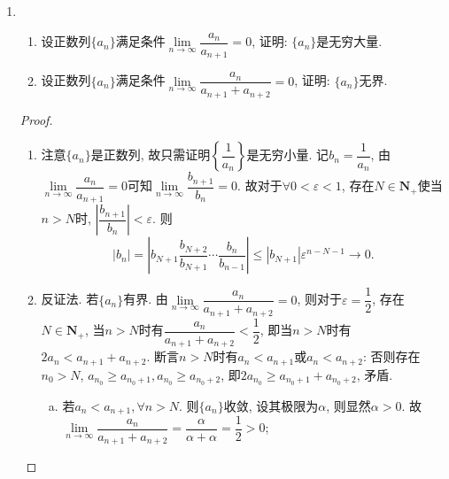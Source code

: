 \documentclass[a4paper,11pt,twoside]{ctexbook}
\begin{document}
\begin{enumerate}
\begin{proof}
\begin{enumerate}[(1)]
			            而$y_n=n(x_n-x_{n-1})=n\cdot(-1)^{n+1}\dfrac{1}{n}=(-1)^{n+1}$显然发散.

			      \item 若$\{y_n\}$收敛, 设其极限为$B$, 则由Stolz定理, 有
			            \[
				            \lim\limits_{n\to\infty} \dfrac{x_n}{1+\dfrac{1}{2}+\cdots+\dfrac{1}{n}}=\lim\limits_{n\to\infty} \dfrac{x_n-x_{n-1}}{\dfrac{1}{n}}=\lim\limits_{n\to\infty} y_n=B.
			            \]
			            注意$\{x_n\}$收敛因而有界, $1+\dfrac{1}{2}+\cdots+\dfrac{1}{n}$是无穷大量, 故$B=\lim\limits_{n\to\infty} \dfrac{x_n}{1+\dfrac{1}{2}+\cdots+\dfrac{1}{n}}=0$, 即$\lim\limits_{n\to\infty} y_n=0$. \qedhere
		      \end{enumerate}
	      \end{proof}
	\item
	      \begin{enumerate}[(1)]
		      \item 设正数列$\{a_n\}$满足条件$\lim\limits_{n\to\infty} \dfrac{a_n}{a_{n+1}}=0$, 证明: $\{a_n\}$是无穷大量.
		      \item 设正数列$\{a_n\}$满足条件$\lim\limits_{n\to\infty} \dfrac{a_n}{a_{n+1}+a_{n+2}}=0$, 证明: $\{a_n\}$无界.
	      \end{enumerate}
	      \begin{proof}
		      \begin{enumerate}[(1)]
			      \item 注意$\{a_n\}$是正数列, 故只需证明$\left\{\dfrac{1}{a_n}\right\}$是无穷小量. 记$b_n=\dfrac{1}{a_n}$, 由$\lim\limits_{n\to\infty} \dfrac{a_n}{a_{n+1}}=0$可知$\lim\limits_{n\to\infty} \dfrac{b_{n+1}}{b_n}=0$. 故对于$\forall 0<\varepsilon<1$, 存在$N\in\mathbf{N}_{+}$使当$n>N$时, $\left|\dfrac{b_{n+1}}{b_{n}}\right|<\varepsilon$. 则
			            \[
				            |b_n|=\left|b_{N+1}\dfrac{b_{N+2}}{b_{N+1}}\cdots\dfrac{b_n}{b_{n-1}}\right|\leqslant|b_{N+1}|\varepsilon^{n-N-1}\to 0.
			            \]
			      \item 反证法. 若$\{a_n\}$有界. 由$\lim\limits_{n\to\infty} \dfrac{a_n}{a_{n+1}+a_{n+2}}=0$, 则对于$\varepsilon=\dfrac{1}{2}$, 存在$N\in\mathbf{N}_{+}$, 当$n>N$时有$\dfrac{a_n}{a_{n+1}+a_{n+2}}<\dfrac{1}{2}$, 即当$n>N$时有$2a_n<a_{n+1}+a_{n+2}$. 断言$n>N$时有$a_n<a_{n+1}$或$a_n<a_{n+2}$: 否则存在$n_0>N$, $a_{n_0}\geqslant a_{n_0+1}, a_{n_0}\geqslant a_{n_0+2}$, 即$2a_{n_0}\geqslant a_{n_0+1}+a_{n_0+2}$, 矛盾.
			            \begin{enumerate}[(a)]
				            \item 若$a_n<a_{n+1}, \forall n>N$. 则$\{a_n\}$收敛, 设其极限为$\alpha$, 则显然$\alpha>0$. 故$\lim\limits_{n\to\infty} \dfrac{a_n}{a_{n+1}+a_{n+2}}=\dfrac{\alpha}{\alpha+\alpha}=\dfrac{1}{2}>0$;

\end{enumerate}
\end{enumerate}
\end{proof}
\end{enumerate}
\end{document}

